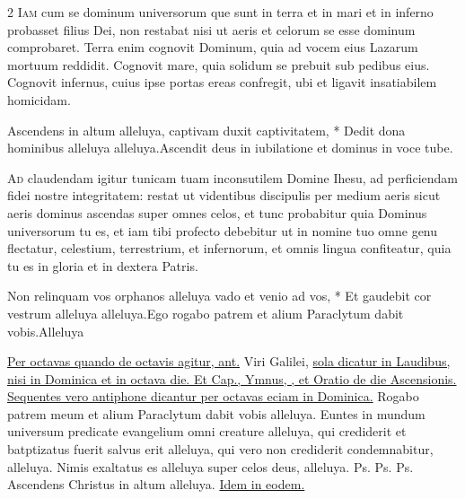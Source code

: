 \begin{multicols*}{2}
\lettrine[lines=2]{\zallmancaps \color{Red} I}{am} cum se dominum universorum que sunt in terra et in mari et in inferno probasset filius Dei, non restabat nisi ut aeris et celorum se esse dominum comprobaret. Terra enim cognovit Dominum, quia ad vocem eius Lazarum mortuum reddidit. Cognovit mare, quia solidum se prebuit sub pedibus eius. Cognovit infernus, cuius ipse portas ereas confregit, ubi et ligavit insatiabilem homicidam.
\begin{responsory}
{Ascendens in altum alleluya, captivam duxit captivitatem, * Dedit dona hominibus alleluya alleluya.}{Ascendit deus in iubilatione et dominus in voce tube.}
\end{responsory}%
\lettrine[lines=2]{\zallmancaps \color{Blue} A}{d} claudendam igitur tunicam tuam inconsutilem Domine Ihesu, ad perficiendam fidei nostre integritatem: restat ut videntibus discipulis per medium aeris sicut aeris dominus ascendas super omnes celos, et tunc probabitur quia Dominus universorum tu es, et iam tibi profecto debebitur ut in nomine tuo omne genu flectatur, celestium, terrestrium, et infernorum, et omnis lingua confiteatur, quia tu es in gloria et in dextera Patris.
\begin{responsory-final}
{Non relinquam vos orphanos alleluya vado et venio ad vos, * Et gaudebit cor vestrum alleluya alleluya.}{Ego rogabo patrem et alium Paraclytum dabit vobis.}{Alleluya}
\end{responsory-final}%
\newline \ul{Per octavas quando de octavis agitur, ant.} Viri Galilei, \ul{sola dicatur in Laudibus, nisi in Dominica et in octava die. Et Cap., Ymnus, \Vbar , et Oratio de die Ascensionis. Sequentes vero antiphone dicantur per octavas eciam in Dominica.}
 Rogabo patrem meum et alium Paraclytum dabit vobis alleluya.
 Euntes in mundum universum predicate evangelium omni creature alleluya, qui crediderit et batptizatus fuerit salvus erit alleluya, qui vero non crediderit condemnabitur, alleluya.
 Nimis exaltatus es alleluya super celos deus, alleluya. {\color{Red} Ps.}  {\color{Red} Ps.}  {\color{Red} Ps.}  \V Ascendens Christus in altum alleluya. \ul{Idem in eodem.} \grecross

\end{multicols*}
